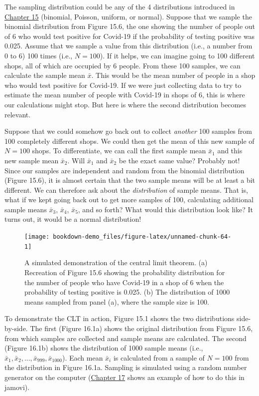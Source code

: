 \documentclass[
]{scrbook}
\begin{document}
The sampling distribution could be any of the 4 distributions introduced in \protect\hyperlink{Chapter_15}{Chapter 15} (binomial, Poisson, uniform, or normal).
Suppose that we sample the binomial distribution from Figure 15.6, the one showing the number of people out of 6 who would test positive for Covid-19 if the probability of testing positive was 0.025.
Assume that we sample a value from this distribution (i.e., a number from 0 to 6) 100 times (i.e., \(N = 100\)).
If it helps, we can imagine going to 100 different shops, all of which are occupied by 6 people.
From these 100 samples, we can calculate the sample mean \(\bar{x}\).
This would be the mean number of people in a shop who would test positive for Covid-19.
If we were just collecting data to try to estimate the mean number of people with Covid-19 in shops of 6, this is where our calculations might stop.
But here is where the second distribution becomes relevant.

Suppose that we could somehow go back out to collect \emph{another} 100 samples from 100 completely different shops.
We could then get the mean of this new sample of \(N = 100\) shops.
To differentiate, we can call the first sample mean \(\bar{x}_{1}\) and this new sample mean \(\bar{x}_{2}\).
Will \(\bar{x}_{1}\) and \(\bar{x}_{2}\) be the exact same value?
Probably not!
Since our samples are independent and random from the binomial distribution (Figure 15.6), it is almost certain that the two sample means will be at least a bit different.
We can therefore ask about the \emph{distribution} of sample means.
That is, what if we kept going back out to get more samples of 100, calculating additional sample means \(\bar{x}_{3}\), \(\bar{x}_{4}\), \(\bar{x}_{5}\), and so forth?
What would this distribution look like?
It turns out, it would be a normal distribution!

\begin{figure}
\texttt{[image: bookdown-demo\_files/figure-latex/unnamed-chunk-64-1]} \caption{A simulated demonstration of the central limit theorem. (a) Recreation of Figure 15.6 showing the probability distribution for the number of people who have Covid-19 in a shop of 6 when the probability of testing positive is 0.025. (b) The distribution of 1000 means sampled from panel (a), where the sample size is 100.}\label{fig:unnamed-chunk-64}
\end{figure}

To demonstrate the CLT in action, Figure 15.1 shows the two distributions side-by-side.
The first (Figure 16.1a) shows the original distribution from Figure 15.6, from which samples are collected and sample means are calculated.
The second (Figure 16.1b) shows the distribution of 1000 sample means (i.e., \(\bar{x}_{1}, \bar{x}_{2}, ..., \bar{x}_{999}, \bar{x}_{1000}\)).
Each mean \(\bar{x}_{i}\) is calculated from a sample of \(N = 100\) from the distribution in Figure 16.1a.
Sampling is simulated using a random number generator on the computer (\protect\hyperlink{Chapter_17}{Chapter 17} shows an example of how to do this in jamovi).
\end{document}
